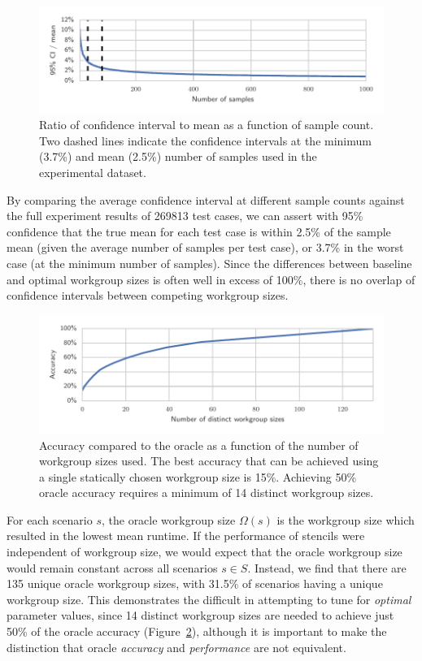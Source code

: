\documentclass[nonatbib,preprint,9pt]{sigplanconf}
\begin{document}
\begin{figure}
\centering
\includegraphics[width=\columnwidth]{img/ci_trend}
\caption[Confidence interval size vs.\ sample count]{%
  Ratio of confidence interval to mean as a function of sample
  count. Two dashed lines indicate the confidence intervals at the
  minimum (3.7\%) and mean (2.5\%) number of samples used in the
  experimental dataset.%
}
\label{fig:ci-trends}
\end{figure}

By comparing the average confidence interval at different sample
counts against the full experiment results of 269813 test cases, we
can assert with 95\% confidence that the true mean for each test case
is within 2.5\% of the sample mean (given the average number of
samples per test case), or 3.7\% in the worst case (at the minimum
number of samples). Since the differences between baseline and optimal
workgroup sizes is often well in excess of 100\%, there is no overlap
of confidence intervals between competing workgroup sizes.


\begin{figure}
\centering
\includegraphics[width=\columnwidth]{img/num_params_oracle.pdf}
\caption[Oracle accuracy vs.\ number of workgroup sizes]{%
  Accuracy compared to the oracle as a function of the number of
  workgroup sizes used. The best accuracy that can be achieved using a
  single statically chosen workgroup size is 15\%. Achieving 50\%
  oracle accuracy requires a minimum of 14 distinct workgroup sizes.%
}
\label{fig:oracle-accuracy}
\end{figure}

For each scenario $s$, the oracle workgroup size $\Omega(s)$ is the
workgroup size which resulted in the lowest mean runtime. If the
performance of stencils were independent of workgroup size, we would
expect that the oracle workgroup size would remain constant across all
scenarios $s \in S$. Instead, we find that there are 135 unique oracle
workgroup sizes, with 31.5\% of scenarios having a unique workgroup
size. This demonstrates the difficult in attempting to tune for
\emph{optimal} parameter values, since 14 distinct workgroup sizes are
needed to achieve just 50\% of the oracle accuracy
(Figure~\ref{fig:oracle-accuracy}), although it is important to make
the distinction that oracle \emph{accuracy} and \emph{performance} are
not equivalent.
\end{document}
